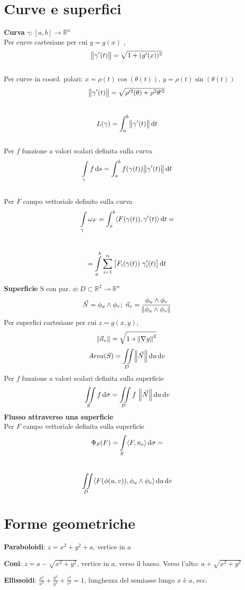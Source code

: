 \documentclass[a4paper,portrait,columns=3,5pt]{cheatsheet}
\begin{document}
\section{Curve e superfici}
\textbf{Curva} $\gamma:[a,b]\rightarrow\mathbb{R}^n$\\
Per curve cartesiane per cui $y = g(x)$ , $$\norm{\gamma'(t)} = \sqrt{1 + (g'(x))^2}$$\\
Per curve in coord. polari: $x = \rho(t) \cos(\theta(t))$, $y = \rho(t) \sin(\theta(t))$
$$\norm{\gamma'(t)} = \sqrt{\rho'^2(\theta) + \rho^2\theta'^2} $$\\
$$ L(\gamma) = \int_{a}^{b} \norm{\gamma'(t)} \dif t$$\\
Per $f$ funzione a valori scalari definita sulla curva
$$ \int\limits_{\gamma} f\dif s = \int_a^b f(\gamma(t)) \norm{\gamma'(t)} \dif t$$\\
Per $F$ campo vettoriale definito sulla curva
$$ \int\limits_\gamma \omega_{F} = \int_a^b \langle F(\gamma(t)), \gamma'(t)\rangle \dif t = $$\\
$$ = \int\limits_a^b \sum_{i=1}^n\left[F_i(\gamma(t))~\gamma_i'(t)\right] \dif t$$

\textbf{Superficie} S con par. $\phi:D\subset\mathbb{R}^2\rightarrow\mathbb{R}^n$\\
$$ \vec N = \phi_u \wedge \phi_v ; ~ \vec n_e = \frac{\phi_u \wedge \phi_v}{\norm{\phi_u \wedge \phi_v}} $$
Per superfici cartesiane per cui $z = g(x,y)$, $$\norm{\vec n_e} = \sqrt{1 + \norm{\nabla g}^2}$$
$$ Area(S) = \iint\limits_D \norm{\vec N} \dif u \dif v$$
Per $f$ funzione a valori scalari definita sulla superficie
$$ \iint\limits_S f \dif \sigma = \iint\limits_D f ~\norm{\vec N} \dif u \dif v $$
\textbf{Flusso attraverso una superficie}\\ Per $F$ campo vettoriale definita sulla superficie
$$ \Phi_S(F) = \int\limits_S \langle F, n_e \rangle \dif \sigma = $$ \\ 
$$ \iint\limits_D \langle F(\phi(u,v)), \phi_u \wedge \phi_v \rangle \dif u \dif v$$

\section{Forme geometriche}

\textbf{Paraboloidi}: $z = x^2 + y^2 + a$, vertice in $a$

\textbf{Coni}: $z = a - \sqrt{x^2 + y^2}$, vertice in $a$, verso il basso. Verso l'alto: $a + \sqrt{x^2 + y^2}$

\textbf{Ellissoidi}: $\frac{x^2}{a^2} + \frac{y^2}{b^2} + \frac{z^2}{c^2} = 1$, lunghezza del semiasse lungo $x$ è $a$, ecc. 
\end{document}
